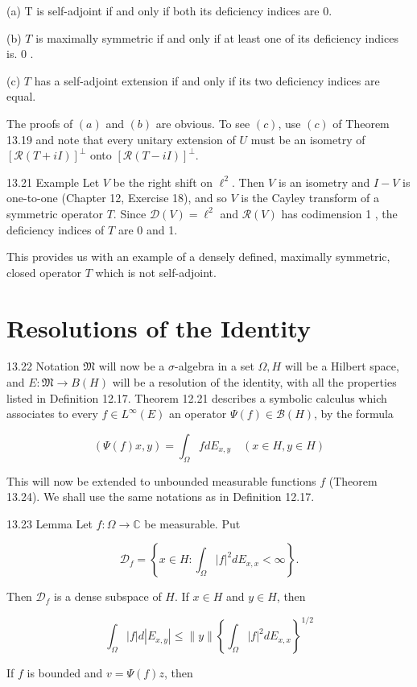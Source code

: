 \documentclass[10pt]{article}
\begin{document}
(a) T is self-adjoint if and only if both its deficiency indices are 0.

(b) $T$ is maximally symmetric if and only if at least one of its deficiency indices is. 0 .

(c) $T$ has a self-adjoint extension if and only if its two deficiency indices are equal.

The proofs of $(a)$ and $(b)$ are obvious. To see $(c)$, use $(c)$ of Theorem 13.19 and note that every unitary extension of $U$ must be an isometry of $[\mathscr{R}(T+i I)]^{\perp}$ onto $[\mathscr{R}(T-i I)]^{\perp}$.

13.21 Example Let $V$ be the right shift on $\ell^{2}$. Then $V$ is an isometry and $I-V$ is one-to-one (Chapter 12, Exercise 18), and so $V$ is the Cayley transform of a symmetric operator $T$. Since $\mathscr{D}(V)=\ell^{2}$ and $\mathscr{R}(V)$ has codimension 1 , the deficiency indices of $T$ are 0 and 1.

This provides us with an example of a densely defined, maximally symmetric, closed operator $T$ which is not self-adjoint.

\section{Resolutions of the Identity}
13.22 Notation $\mathfrak{M}$ will now be a $\sigma$-algebra in a set $\Omega, H$ will be a Hilbert space, and $E: \mathfrak{M} \rightarrow B(H)$ will be a resolution of the identity, with all the properties listed in Definition 12.17. Theorem 12.21 describes a symbolic calculus which associates to every $f \in L^{\infty}(E)$ an operator $\Psi(f) \in \mathscr{B}(H)$, by the formula

$$
(\Psi(f) x, y)=\int_{\Omega} f d E_{x, y} \quad(x \in H, y \in H)
$$

This will now be extended to unbounded measurable functions $f$ (Theorem 13.24). We shall use the same notations as in Definition 12.17.

13.23 Lemma Let $f: \Omega \rightarrow \mathbb{C}$ be measurable. Put

$$
\mathscr{D}_{f}=\left\{x \in H: \int_{\Omega}|f|^{2} d E_{x, x}<\infty\right\} .
$$

Then $\mathscr{D}_{f}$ is a dense subspace of $H$. If $x \in H$ and $y \in H$, then

$$
\int_{\Omega}|f| d\left|E_{x, y}\right| \leq\|y\|\left\{\int_{\Omega}|f|^{2} d E_{x, x}\right\}^{1 / 2}
$$

If $f$ is bounded and $v=\Psi(f) z$, then
\end{document}
